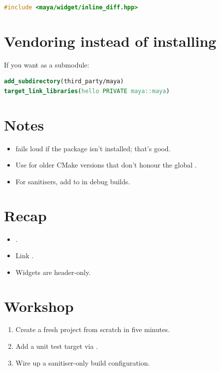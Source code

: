 \begin{lstlisting}[language=C++]
#include <maya/widget/inline_diff.hpp>
\end{lstlisting}

\section{Vendoring instead of installing}

If you want \maya{} as a submodule:

\begin{lstlisting}[language=cmake]
add_subdirectory(third_party/maya)
target_link_libraries(hello PRIVATE maya::maya)
\end{lstlisting}

\section{Notes}

\begin{itemize}[leftmargin=*]
  \item {} fails loud if
    the package isn't installed; that's good.
  \item Use 
    for older CMake versions that don't honour the global
    .
  \item For sanitisers, add 
    to  in debug builds.
\end{itemize}

\section{Recap}

\begin{recap}
\begin{itemize}[leftmargin=*]
  \item {}.
  \item Link .
  \item Widgets are header-only.
\end{itemize}
\end{recap}

\section*{Workshop}

\begin{enumerate}[leftmargin=*]
  \item Create a fresh \maya{} project from scratch in five
    minutes.
  \item Add a unit test target via .
  \item Wire up a sanitiser-only build configuration.
\end{enumerate}
